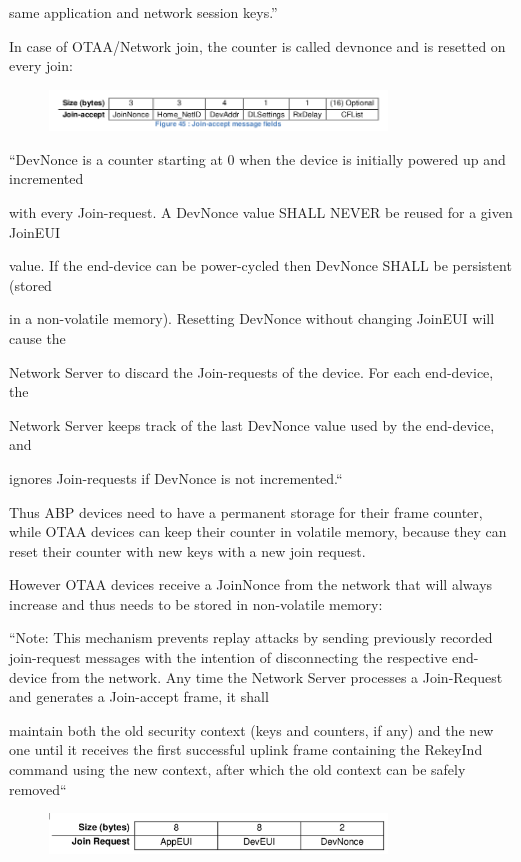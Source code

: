 {same application and network session keys.''}

{In case of OTAA/Network join, the counter is called devnonce and is
resetted on every join:}

\begin{figure}[h!]
{\includegraphics[width=0.8\textwidth]{images/image14.png}}
\end{figure}

{``DevNonce is a counter starting at 0 when the device is initially
powered up and incremented}

{with every Join-request. A DevNonce value SHALL NEVER be reused for a
given JoinEUI}

{value. If the end-device can be power-cycled then DevNonce SHALL be
persistent (stored}

{in a non-volatile memory). Resetting DevNonce without changing JoinEUI
will cause the}

{Network Server to discard the Join-requests of the device. For each
end-device, the}

{Network Server keeps track of the last DevNonce value used by the
end-device, and}

{ignores Join-requests if DevNonce is not incremented.``}

{Thus ABP devices need to have a permanent storage for their frame
counter, while OTAA devices can keep their counter in volatile memory,
because they can reset their counter with new keys with a new join
request.}

{However OTAA devices receive a JoinNonce from the network that will
always increase and thus needs to be stored in non-volatile memory:}

{``Note: This mechanism prevents replay attacks by sending previously
recorded join-request messages with the intention of disconnecting the
respective end-device from the network. Any time the Network Server
processes a Join-Request and generates a Join-accept frame, it shall}

{maintain both the old security context (keys and counters, if any) and
the new one until it receives the first successful uplink frame
containing the RekeyInd command using the new context, after which the
old context can be safely removed``}

\begin{figure}[h!]
{\includegraphics[width=0.8\textwidth]{images/image16.png}}
\end{figure}

